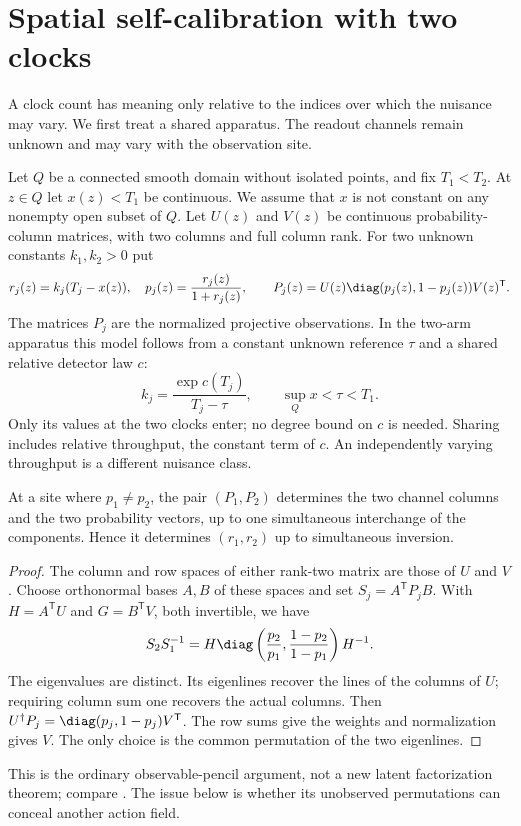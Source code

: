 \section{Spatial self-calibration with two clocks}
\label{sec:v86-shared}
A clock count has meaning only relative to the indices over which the
nuisance may vary. We first treat a shared apparatus. The readout
channels remain unknown and may vary with the observation site.

Let $Q$ be a connected smooth domain without isolated points, and fix
$T_1<T_2$. At $z\in Q$ let $x(z)<T_1$ be continuous. We assume that
$x$ is not constant on any nonempty open subset of $Q$. Let $U(z)$ and
$V(z)$ be continuous probability-column matrices, with two columns
and full column rank. For two unknown constants $k_1,k_2>0$ put
\begin{equation}\label{eq:v86-shared-model}
 r_j(z)=k_j(T_j-x(z)),\quad p_j(z)=\frac{r_j(z)}{1+r_j(z)},\qquad
 P_j(z)=U(z)\diag(p_j(z),1-p_j(z))V(z)^{\mathsf T}.
\end{equation}
The matrices $P_j$ are the normalized projective observations. In the
two-arm apparatus this model follows from a constant unknown reference
$\tau$ and a shared relative detector law $c$:
\[
 k_j=\frac{\exp c(T_j)}{T_j-\tau},\qquad
       \sup_Qx<\tau<T_1.
\]
Only its values at the two clocks enter; no degree bound on $c$ is
needed. Sharing includes relative throughput, the constant term of $c$.
An independently varying throughput is a different nuisance class.

\begin{lemma}
\label{lem:v86-two-mixtures}
At a site where $p_1\ne p_2$, the pair $(P_1,P_2)$ determines the two
channel columns and the two probability vectors, up to one simultaneous
interchange of the components. Hence it determines
$(r_1,r_2)$ up to simultaneous inversion.
\end{lemma}
\begin{proof}
The column and row spaces of either rank-two matrix are those of $U$
and $V$. Choose orthonormal bases $A,B$ of these spaces and set
$S_j=A^{\mathsf T}P_jB$. With $H=A^{\mathsf T}U$ and
$G=B^{\mathsf T}V$, both invertible, we have
\[
 S_2S_1^{-1}=H\diag\left(\frac{p_2}{p_1},
                    \frac{1-p_2}{1-p_1}\right)H^{-1}.
\]
The eigenvalues are distinct. Its eigenlines recover the lines of the
columns of $U$; requiring column sum one recovers the actual columns.
Then $U^\dagger P_j=\diag(p_j,1-p_j)V^{\mathsf T}$.
The row sums give the weights and normalization gives $V$. The only
choice is the common permutation of the two eigenlines.
\end{proof}
This is the ordinary observable-pencil argument, not a new latent
factorization theorem; compare \cite{V83AMR,V83BJR}. The issue below is
whether its unobserved permutations can conceal another action field.


